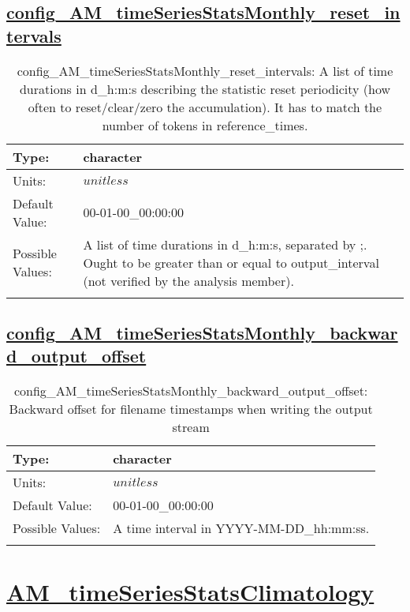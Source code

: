 \subsection[config\_AM\_timeSeriesStatsMonthly\_reset\_intervals]{\hyperref[sec:nm_tab_AM_timeSeriesStatsMonthly]{config\_AM\_timeSeriesStatsMonthly\_reset\_intervals}}
\label{subsec:nm_sec_config_AM_timeSeriesStatsMonthly_reset_intervals}
\begin{center}
\begin{longtable}{| p{2.0in} || p{4.0in} |}
    \hline
    Type: & character \\
    \hline
    Units: & $unitless$ \\
    \hline
    Default Value: & 00-01-00\_00:00:00 \\
    \hline
    Possible Values: & A list of time durations in d\_h:m:s, separated by ;. Ought to be greater than or equal to output\_interval (not verified by the analysis member). \\
    \hline
    \caption{config\_AM\_timeSeriesStatsMonthly\_reset\_intervals: A list of time durations in d\_h:m:s describing the statistic reset periodicity (how often to reset/clear/zero the accumulation). It has to match the number of tokens in reference\_times.}
\end{longtable}
\end{center}
\subsection[config\_AM\_timeSeriesStatsMonthly\_backward\_output\_offset]{\hyperref[sec:nm_tab_AM_timeSeriesStatsMonthly]{config\_AM\_timeSeriesStatsMonthly\_backward\_output\_offset}}
\label{subsec:nm_sec_config_AM_timeSeriesStatsMonthly_backward_output_offset}
\begin{center}
\begin{longtable}{| p{2.0in} || p{4.0in} |}
    \hline
    Type: & character \\
    \hline
    Units: & $unitless$ \\
    \hline
    Default Value: & 00-01-00\_00:00:00 \\
    \hline
    Possible Values: & A time interval in YYYY-MM-DD\_hh:mm:ss. \\
    \hline
    \caption{config\_AM\_timeSeriesStatsMonthly\_backward\_output\_offset: Backward offset for filename timestamps when writing the output stream}
\end{longtable}
\end{center}
\section[AM\_timeSeriesStatsClimatology]{\hyperref[sec:nm_tab_AM_timeSeriesStatsClimatology]{AM\_timeSeriesStatsClimatology}}
\label{sec:nm_sec_AM_timeSeriesStatsClimatology}
